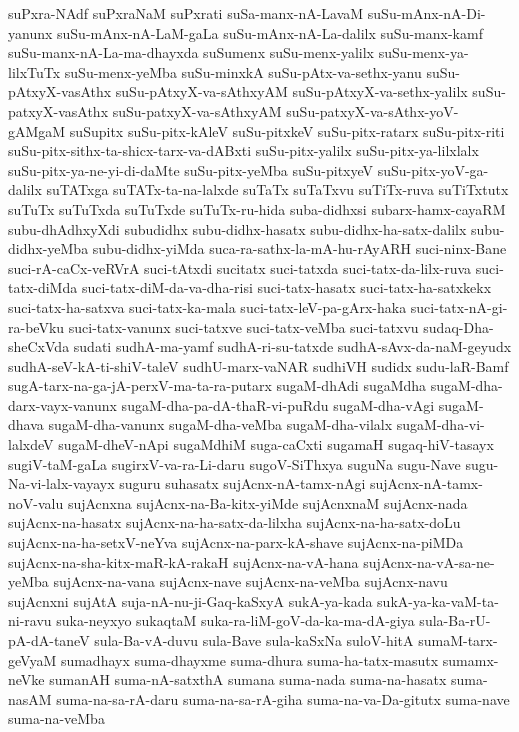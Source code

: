 {suPxra-NAdf
suPxraNaM
suPxrati
suSa-manx-nA-LavaM
suSu-mAnx-nA-Di-yanunx
suSu-mAnx-nA-LaM-gaLa
suSu-mAnx-nA-La-dalilx
suSu-manx-kamf
suSu-manx-nA-La-ma-dhayxda
suSumenx
suSu-menx-yalilx
suSu-menx-ya-lilxTuTx
suSu-menx-yeMba
suSu-minxkA
suSu-pAtx-va-sethx-yanu
suSu-pAtxyX-vasAthx
suSu-pAtxyX-va-sAthxyAM
suSu-pAtxyX-va-sethx-yalilx
suSu-patxyX-vasAthx
suSu-patxyX-va-sAthxyAM
suSu-patxyX-va-sAthx-yoV-gAMgaM
suSupitx
suSu-pitx-kAleV
suSu-pitxkeV
suSu-pitx-ratarx
suSu-pitx-riti
suSu-pitx-sithx-ta-shicx-tarx-va-dABxti
suSu-pitx-yalilx
suSu-pitx-ya-lilxlalx
suSu-pitx-ya-ne-yi-di-daMte
suSu-pitx-yeMba
suSu-pitxyeV
suSu-pitx-yoV-ga-dalilx
suTATxga
suTATx-ta-na-lalxde
suTaTx
suTaTxvu
suTiTx-ruva
suTiTxtutx
suTuTx
suTuTxda
suTuTxde
suTuTx-ru-hida
suba-didhxsi
subarx-hamx-cayaRM
subu-dhAdhxyXdi
subudidhx
subu-didhx-hasatx
subu-didhx-ha-satx-dalilx
subu-didhx-yeMba
subu-didhx-yiMda
suca-ra-sathx-la-mA-hu-rAyARH
suci-ninx-Bane
suci-rA-caCx-veRVrA
suci-tAtxdi
sucitatx
suci-tatxda
suci-tatx-da-lilx-ruva
suci-tatx-diMda
suci-tatx-diM-da-va-dha-risi
suci-tatx-hasatx
suci-tatx-ha-satxkekx
suci-tatx-ha-satxva
suci-tatx-ka-mala
suci-tatx-leV-pa-gArx-haka
suci-tatx-nA-gi-ra-beVku
suci-tatx-vanunx
suci-tatxve
suci-tatx-veMba
suci-tatxvu
sudaq-Dha-sheCxVda
sudati
sudhA-ma-yamf
sudhA-ri-su-tatxde
sudhA-sAvx-da-naM-geyudx
sudhA-seV-kA-ti-shiV-taleV
sudhU-marx-vaNAR
sudhiVH
sudidx
sudu-laR-Bamf
sugA-tarx-na-ga-jA-perxV-ma-ta-ra-putarx
sugaM-dhAdi
sugaMdha
sugaM-dha-darx-vayx-vanunx
sugaM-dha-pa-dA-thaR-vi-puRdu
sugaM-dha-vAgi
sugaM-dhava
sugaM-dha-vanunx
sugaM-dha-veMba
sugaM-dha-vilalx
sugaM-dha-vi-lalxdeV
sugaM-dheV-nApi
sugaMdhiM
suga-caCxti
sugamaH
sugaq-hiV-tasayx
sugiV-taM-gaLa
sugirxV-va-ra-Li-daru
sugoV-SiThxya
suguNa
sugu-Nave
sugu-Na-vi-lalx-vayayx
suguru
suhasatx
sujAcnx-nA-tamx-nAgi
sujAcnx-nA-tamx-noV-valu
sujAcnxna
sujAcnx-na-Ba-kitx-yiMde
sujAcnxnaM
sujAcnx-nada
sujAcnx-na-hasatx
sujAcnx-na-ha-satx-da-lilxha
sujAcnx-na-ha-satx-doLu
sujAcnx-na-ha-setxV-neYva
sujAcnx-na-parx-kA-shave
sujAcnx-na-piMDa
sujAcnx-na-sha-kitx-maR-kA-rakaH
sujAcnx-na-vA-hana
sujAcnx-na-vA-sa-ne-yeMba
sujAcnx-na-vana
sujAcnx-nave
sujAcnx-na-veMba
sujAcnx-navu
sujAcnxni
sujAtA
suja-nA-nu-ji-Gaq-kaSxyA
sukA-ya-kada
sukA-ya-ka-vaM-ta-ni-ravu
suka-neyxyo
sukaqtaM
suka-ra-liM-goV-da-ka-ma-dA-giya
sula-Ba-rU-pA-dA-taneV
sula-Ba-vA-duvu
sula-Bave
sula-kaSxNa
suloV-hitA
sumaM-tarx-geVyaM
sumadhayx
suma-dhayxme
suma-dhura
suma-ha-tatx-masutx
sumamx-neVke
sumanAH
suma-nA-satxthA
sumana
suma-nada
suma-na-hasatx
suma-nasAM
suma-na-sa-rA-daru
suma-na-sa-rA-giha
suma-na-va-Da-gitutx
suma-nave
suma-na-veMba
}
